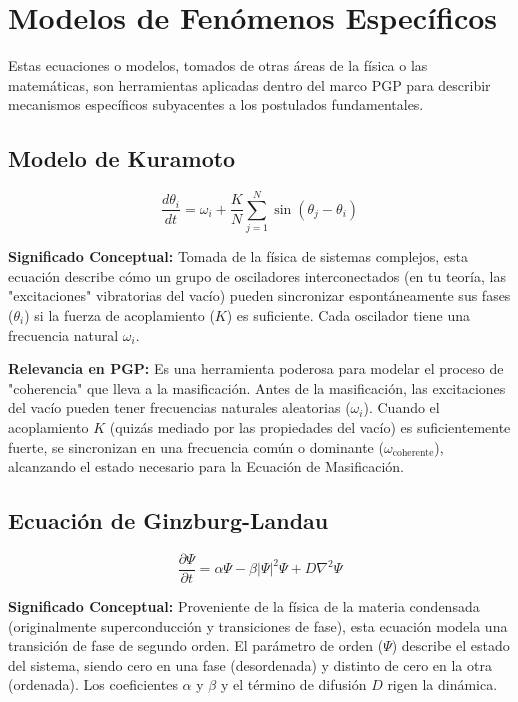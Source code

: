\documentclass{article}
\begin{document}
\section{Modelos de Fenómenos Específicos}

Estas ecuaciones o modelos, tomados de otras áreas de la física o las matemáticas, son herramientas aplicadas dentro del marco PGP para describir mecanismos específicos subyacentes a los postulados fundamentales.

\subsection{Modelo de Kuramoto}

\begin{equation*}
\frac{d\theta_i}{dt} = \omega_i + \frac{K}{N} \sum_{j=1}^{N} \sin(\theta_j - \theta_i)
\end{equation*}

\textbf{Significado Conceptual:} Tomada de la física de sistemas complejos, esta ecuación describe cómo un grupo de osciladores interconectados (en tu teoría, las "excitaciones" vibratorias del vacío) pueden sincronizar espontáneamente sus fases ($\theta_i$) si la fuerza de acoplamiento ($K$) es suficiente. Cada oscilador tiene una frecuencia natural $\omega_i$.

\textbf{Relevancia en PGP:} Es una herramienta poderosa para modelar el proceso de "coherencia" que lleva a la masificación. Antes de la masificación, las excitaciones del vacío pueden tener frecuencias naturales aleatorias ($\omega_i$). Cuando el acoplamiento $K$ (quizás mediado por las propiedades del vacío) es suficientemente fuerte, se sincronizan en una frecuencia común o dominante ($\omega_{\text{coherente}}$), alcanzando el estado necesario para la Ecuación de Masificación.

\subsection{Ecuación de Ginzburg-Landau}

\begin{equation*}
\frac{\partial\Psi}{\partial t} = \alpha \Psi - \beta \left|\Psi\right|^2 \Psi + D \nabla^2 \Psi
\end{equation*}

\textbf{Significado Conceptual:} Proveniente de la física de la materia condensada (originalmente superconducción y transiciones de fase), esta ecuación modela una transición de fase de segundo orden. El parámetro de orden ($\Psi$) describe el estado del sistema, siendo cero en una fase (desordenada) y distinto de cero en la otra (ordenada). Los coeficientes $\alpha$ y $\beta$ y el término de difusión $D$ rigen la dinámica.
\end{document}
